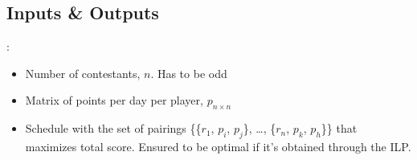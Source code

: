 \documentclass[
9pt,
aspectratio=169,
xcolor=table,
]{beamer}
\begin{document}
\subsection{Inputs \& Outputs}
\begin{frame}{\secname: \subsecname}
    \begin{tcolorbox}[colback=gray!30, colframe=Veronablue, arc=0pt, outer arc=0pt, title = \textbf{Inputs}]
    \begin{itemize}
	\item Number of contestants, $n$. Has to be odd
	\item Matrix of points per day per player, $p_{n \times n}$
    \end{itemize}
    \end{tcolorbox}

    \begin{tcolorbox}[colback=gray!30, colframe=Veronablue, arc=0pt, outer arc=0pt, title = \textbf{Outputs}]
    \begin{itemize}
	\item Schedule with the set of pairings \{\{$r_1$, $p_i$, $p_j$\}, \dots, \{$r_n$, $p_k$, $p_h$\}\} that maximizes total score. Ensured to be optimal if it's obtained through the ILP.
    \end{itemize}
    \end{tcolorbox}
    
\end{frame}
\end{document}
